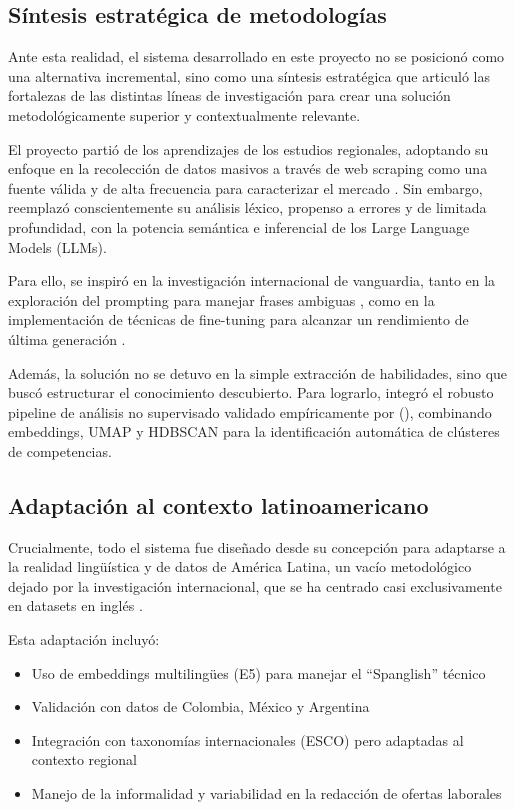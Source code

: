 \subsection{Síntesis estratégica de metodologías}

Ante esta realidad, el sistema desarrollado en este proyecto no se posicionó como una alternativa incremental, sino como una síntesis estratégica que articuló las fortalezas de las distintas líneas de investigación para crear una solución metodológicamente superior y contextualmente relevante.

El proyecto partió de los aprendizajes de los estudios regionales, adoptando su enfoque en la recolección de datos masivos a través de web scraping como una fuente válida y de alta frecuencia para caracterizar el mercado \parencite{aguilera2018, martinez2024, rubio2024}. Sin embargo, reemplazó conscientemente su análisis léxico, propenso a errores y de limitada profundidad, con la potencia semántica e inferencial de los Large Language Models (LLMs).

Para ello, se inspiró en la investigación internacional de vanguardia, tanto en la exploración del prompting para manejar frases ambiguas \parencite{nguyen2024}, como en la implementación de técnicas de fine-tuning para alcanzar un rendimiento de última generación \parencite{herandi2024}.

Además, la solución no se detuvo en la simple extracción de habilidades, sino que buscó estructurar el conocimiento descubierto. Para lograrlo, integró el robusto pipeline de análisis no supervisado validado empíricamente por \citeauthor{lukauskas2023} (\citeyear{lukauskas2023}), combinando embeddings, UMAP y HDBSCAN para la identificación automática de clústeres de competencias.

\subsection{Adaptación al contexto latinoamericano}

Crucialmente, todo el sistema fue diseñado desde su concepción para adaptarse a la realidad lingüística y de datos de América Latina, un vacío metodológico dejado por la investigación internacional, que se ha centrado casi exclusivamente en datasets en inglés \parencite{herandi2024}.

Esta adaptación incluyó:

\begin{itemize}
    \item Uso de embeddings multilingües (E5) para manejar el ``Spanglish'' técnico
    \item Validación con datos de Colombia, México y Argentina
    \item Integración con taxonomías internacionales (ESCO) pero adaptadas al contexto regional
    \item Manejo de la informalidad y variabilidad en la redacción de ofertas laborales
\end{itemize}

